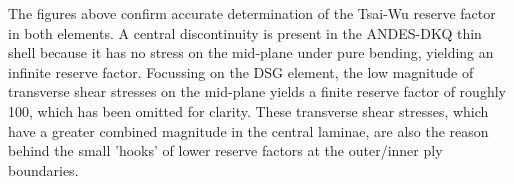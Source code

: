 The figures above confirm accurate determination of the Tsai-Wu reserve factor in both elements. A central discontinuity is present in the ANDES-DKQ thin shell because it has no stress on the mid-plane under pure bending, yielding an infinite reserve factor. Focussing on the DSG element, the low magnitude of transverse shear stresses on the mid-plane yields a finite reserve factor of roughly 100, which has been omitted for clarity. These transverse shear stresses, which have a greater combined magnitude in the central laminae, are also the reason behind the small 'hooks' of lower reserve factors at the outer/inner ply boundaries.
